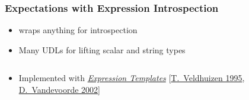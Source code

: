 \documentclass[10pt,aspectratio=169,utf8]{beamer}
\begin{document}
\begin{frame}[fragile]
  \frametitle{Expectations with Expression Introspection}

  \begin{itemize}
    \item
     wraps anything for introspection
    \item
    Many UDLs for lifting scalar and string types
  \end{itemize}

  \begin{columns}[onlytextwidth]
    \begin{column}{.5\textwidth}
    \end{column}

    \begin{column}{.5\textwidth}
    \end{column}
  \end{columns}

  \begin{itemize}
    \item
    Implemented with \emph{\href{https://en.wikipedia.org/wiki/Expression_templates}{Expression Templates}}
    [\href{https://web.archive.org/web/20050210090012/http://osl.iu.edu/~tveldhui/papers/Expression-Templates/exprtmpl.html}{T.\ Veldhuizen 1995},
    \href{https://www.amazon.de/-/en/David-Vandervoorde/dp/0201734842}{D.\ Vandevoorde 2002}]
  \end{itemize}
\end{frame}
\end{document}

